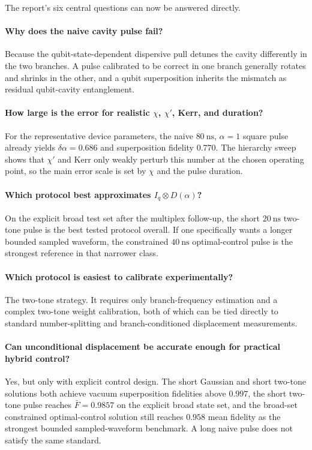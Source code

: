 \documentclass[aps,pra,twocolumn,reprint,floatfix,amsmath,amssymb]{revtex4-2}
\begin{document}
The report's six central questions can now be answered directly.

\paragraph*{Why does the naive cavity pulse fail?}
Because the qubit-state-dependent dispersive pull detunes the cavity differently in the two branches. A pulse calibrated to be correct in one branch generally rotates and shrinks in the other, and a qubit superposition inherits the mismatch as residual qubit-cavity entanglement.

\paragraph*{How large is the error for realistic \(\chi\), \(\chi'\), Kerr, and duration?}
For the representative device parameters, the naive \(\SI{80}{\nano\second}\), \(\alpha=1\) square pulse already yields \(\delta\alpha=0.686\) and superposition fidelity \(0.770\). The hierarchy sweep shows that \(\chi'\) and Kerr only weakly perturb this number at the chosen operating point, so the main error scale is set by \(\chi\) and the pulse duration.

\paragraph*{Which protocol best approximates \(I_q \otimes D(\alpha)\)?}
On the explicit broad test set after the multiplex follow-up, the short \(\SI{20}{\nano\second}\) two-tone pulse is the best tested protocol overall. If one specifically wants a longer bounded sampled waveform, the constrained \(\SI{40}{\nano\second}\) optimal-control pulse is the strongest reference in that narrower class.

\paragraph*{Which protocol is easiest to calibrate experimentally?}
The two-tone strategy. It requires only branch-frequency estimation and a complex two-tone weight calibration, both of which can be tied directly to standard number-splitting and branch-conditioned displacement measurements.

\paragraph*{Can unconditional displacement be accurate enough for practical hybrid control?}
Yes, but only with explicit control design. The short Gaussian and short two-tone solutions both achieve vacuum superposition fidelities above \(0.997\), the short two-tone pulse reaches \(\bar{F}=0.9857\) on the explicit broad state set, and the broad-set constrained optimal-control solution still reaches \(0.958\) mean fidelity as the strongest bounded sampled-waveform benchmark. A long naive pulse does not satisfy the same standard.
\end{document}
